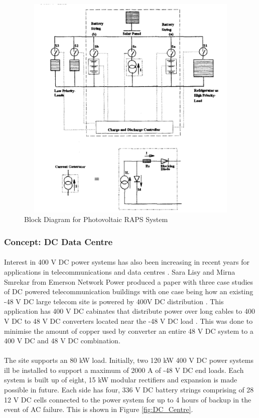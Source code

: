 \begin{figure}[H]
\hfill\includegraphics[width = 140mm, height = 110mm]{images/RAPS_Block}\hspace*{\fill}
\caption{{Block Diagram for Photovoltaic RAPS System \cite{Zahedi}}}
\label{fig:RAPS_Block}
\end{figure}        


\subsubsection{Concept: DC Data Centre}

\paragraph{}
Interest in 400 V DC power systems has also been increasing in recent years for applications in telecommunications and data centres \cite{Lisy2015}. Sara Lisy and Mirna Smrekar from Emerson Network Power produced a paper with three case studies of DC powered telecommunication buildings with one case being how an existing -48 V DC large telecom site is powered by 400V DC distribution \cite{Lisy2015}. This application has 400 V DC cabinates that distribute power over long cables to 400 V DC to 48 V DC converters located near the -48 V DC load \cite{Lisy2015}. This was done to minimise the amount of copper used by converter an entire 48 V DC system to a 400 V DC and 48 V DC combination.

\paragraph{}
The site supports an 80 kW load. Initially, two 120 kW 400 V DC power systems ill be installed to support a maximum of 2000 A of -48 V DC end loads. Each system is built up of eight, 15 kW modular rectifiers and expansion is made possible in future. Each side has four, 336 V DC battery strings comprising of 28 12 V DC cells connected to the power system for up to 4 hours of backup in the event of AC failure. This is shown in Figure \ref{fig:DC_Centre}. 

